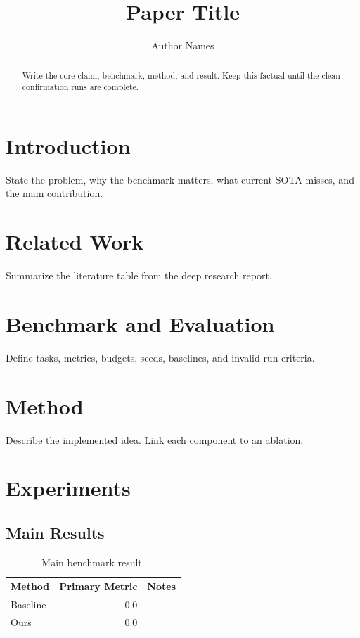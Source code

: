 \documentclass[10pt]{article}
\title{Paper Title}
\author{Author Names}
\date{}
\begin{document}
\maketitle

\begin{abstract}
Write the core claim, benchmark, method, and result. Keep this factual until
the clean confirmation runs are complete.
\end{abstract}

\section{Introduction}

State the problem, why the benchmark matters, what current SOTA misses, and the
main contribution.

\section{Related Work}

Summarize the literature table from the deep research report.

\section{Benchmark and Evaluation}

Define tasks, metrics, budgets, seeds, baselines, and invalid-run criteria.

\section{Method}

Describe the implemented idea. Link each component to an ablation.

\section{Experiments}

\subsection{Main Results}

\begin{table}[h]
\centering
\begin{tabular}{lrr}
\toprule
Method & Primary Metric & Notes \\
\midrule
Baseline & 0.0 & \\
Ours & 0.0 & \\
\bottomrule
\end{tabular}
\caption{Main benchmark result.}
\end{table}
\end{document}
